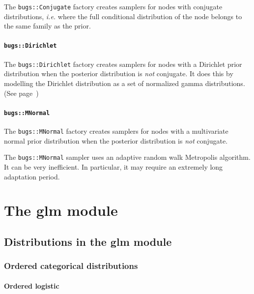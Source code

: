 \documentclass[11pt, a4paper, titlepage]{report}
\begin{document}
{The \texttt{bugs::Conjugate} factory creates samplers for nodes with
conjugate distributions, {\em i.e.} where the full conditional
distribution of the node belongs to the same family as the prior.

\subsubsection{\texttt{bugs::Dirichlet}}

The \texttt{bugs::Dirichlet} factory creates samplers for nodes with a
Dirichlet prior distribution when the posterior distribution is {\em
  not} conjugate. It does this by modelling the Dirichlet distribution
as a set of normalized gamma distributions. (See page~\pageref{bugs:ddirch})

\subsubsection{\texttt{bugs::MNormal}}

The \texttt{bugs::MNormal} factory creates samplers for nodes with a
multivariate normal prior distribution when the posterior distribution
is {\em not} conjugate.

The \texttt{bugs::MNormal} sampler uses an adaptive random walk
Metropolis algorithm. It can be very inefficient. In particular, it
may require an extremely long adaptation period.


\chapter{The glm module}
\label{chapter:glm}

\section{Distributions in the glm module}
\label{section:glm:distributions}

\subsection{Ordered categorical distributions}
\label{glm:dordered.categorical}

\subsubsection{Ordered logistic}

}
\end{document}

